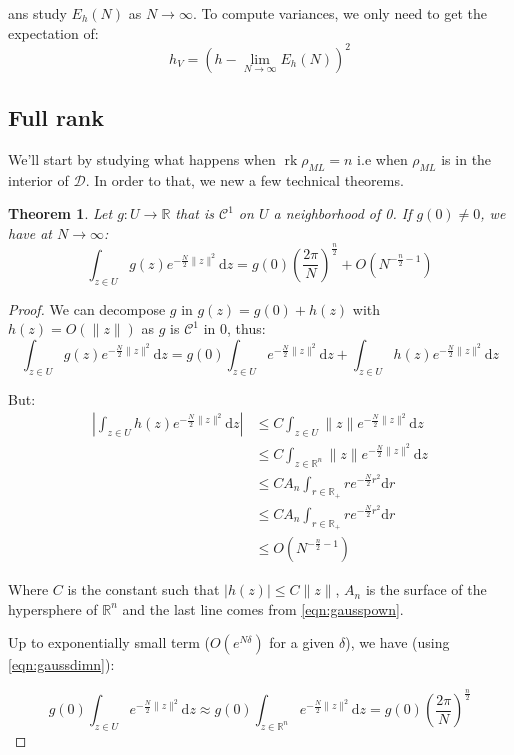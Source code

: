 \documentclass[10pt]{report}
\theoremstyle{plain}
\newtheorem{thm}{Theorem}[chapter]
\theoremstyle{definition}
\theoremstyle{remark}
\newcommand{\R}{\ensuremath{\mathbb{R}}}
\newcommand{\dd}{\mathrm{d}}
\renewcommand{\leq}{\leqslant}
\DeclareMathOperator{\rk}{rk}
\newcommand{\class}[1]{{\mathscr{C}^{#1}}}
\newcommand{\ml}{_{M\!L}}
\begin{document}
ans study $E_h(N)$ as $N \to \infty$. To compute variances, we only need to get
the expectation of:
\[h_V = \left(h - \lim_{N \to \infty} E_h(N)\right)^2\]



\subsection{Full rank}

We'll start by studying what happens when $\rk \rho\ml = n$ i.e when $\rho\ml$
is in the interior of $\mathcal{D}$. In order to that, we new a few technical theorems.

\begin{thm}\label{thm:asy1}
  Let $g : U \to \R$ that is $\class 1$ on $U$ a neighborhood of 0. If $g(0)
  \neq 0$, we have at $N \to \infty$:
  \[\int_{z \in U} g(z)e^{-\frac N2\|z\|^2} \dd z = g(0){\left(\frac
      {2\pi}{N}\right)}^{\frac n 2} +
    O\left({N^{-\frac n 2 -1}}\right)\]
\end{thm}

\begin{proof}

  We can decompose $g$ in $g(z) = g(0) + h(z)$ with $h(z) = O(\|z\|)$ as $g$ is
  $\class{1}$ in 0, thus:
\[\int_{z \in U} g(z)e^{-\frac N2\|z\|^2} \dd z = g(0)\int_{z \in U} e^{-\frac
    N2\|z\|^2} \dd z + \int_{z \in U} h(z)e^{-\frac N2\|z\|^2} \dd z\]

But:
\begin{align*}
  \left |\int_{z \in U} h(z)e^{-\frac N2\|z\|^2} \dd z\right|
  &\leq C \int_{z \in U} \|z\|e^{-\frac N2\|z\|^2} \dd z\\
  &\leq C \int_{z \in \R^n} \|z\|e^{-\frac N2\|z\|^2} \dd z\\
  &\leq CA_n \int_{r \in \R_+} re^{-\frac N2 r^2} \dd r\\
  &\leq CA_n \int_{r \in \R_+} re^{-\frac N2 r^2} \dd r\\
  &\leq O\left({N^{-\frac n 2 -1}}\right)
\end{align*}

Where $C$ is the constant such that $|h(z)| \leq C \|z\|$, $A_n$ is the surface
of the hypersphere of $\R^n$ and the last line comes from \cref{eqn:gausspown}.

Up to exponentially small term ($O(e^{N\delta})$ for a given $\delta$), we have
(using \cref{eqn:gaussdimn}):

\[g(0)\int_{z \in U} e^{-\frac
    N2\|z\|^2} \dd z \approx g(0)\int_{z \in \R^n} e^{-\frac
    N2\|z\|^2} \dd z = g(0) {\left(\frac
      {2\pi}{N}\right)}^{\frac n 2}\]

\end{proof}
\end{document}
